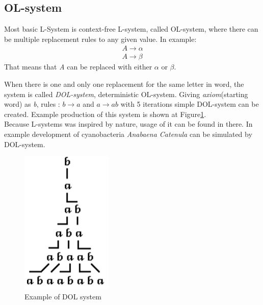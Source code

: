 \documentclass[b5paper,twoside,11pt]{article}
\renewcommand{\figurename}{Figure}
\begin{document}
\subsection{OL-system}
Most basic L-System is context-free L-system, called OL-system, where there can be multiple replacement rules to any given value. In example:
\begin{equation}
\begin{aligned}
A \longrightarrow \alpha \\
A \longrightarrow \beta
\end{aligned}
\end{equation}
That means that \textit{A} can be replaced with either $\alpha$ or $\beta$.\\
\par When there is one and only one replacement for the same letter in word, the system is called \textit{DOL-system}, deterministic OL-system.
Giving \textit{axiom}(starting word) as \textit{b}, rules : $b \rightarrow a$ and $a \rightarrow ab$ with 5 iterations simple DOL-system can be created. Example production of this system is shown at \figurename\ref{DOL}.\\
Because L-systems was inspired by nature, usage of it can be found in there. In example  development of cyanobacteria \textit{Anabaena Catenula} can be simulated by DOL-system.
\begin{figure}[!htp]
\centering
  \includegraphics[width=0.15\linewidth]{DOL-system}
\caption{Example of DOL system\cite{prusinABOP} \label{DOL}}
\end{figure}
\end{document}
